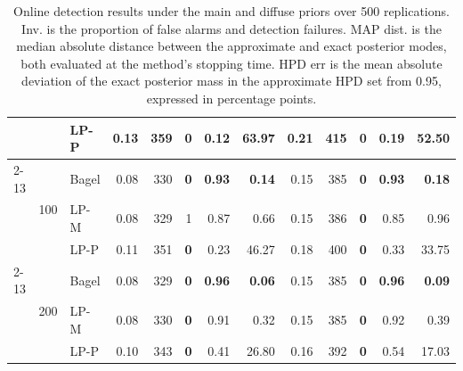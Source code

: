 \begin{table}[H]
{\begin{tabular}{l|r|l|r|r|r|r|r|r|r|r|r|r}
 &  & LP-P & 0.13 & 359 & \textbf{0} & 0.12 & 63.97 & 0.21 & 415 & \textbf{0} & 0.19 & 52.50 \\
\cline{2-13}
 & \multirow{3}{*}{100} & Bagel & 0.08 & 330 & \textbf{0} & \textbf{0.93} & \textbf{0.14} & 0.15 & 385 & \textbf{0} & \textbf{0.93} & \textbf{0.18} \\
 &  & LP-M & 0.08 & 329 & 1 & 0.87 & 0.66 & 0.15 & 386 & \textbf{0} & 0.85 & 0.96 \\
 &  & LP-P & 0.11 & 351 & \textbf{0} & 0.23 & 46.27 & 0.18 & 400 & \textbf{0} & 0.33 & 33.75 \\
\cline{2-13}
 & \multirow{3}{*}{200} & Bagel & 0.08 & 329 & \textbf{0} & \textbf{0.96} & \textbf{0.06} & 0.15 & 385 & \textbf{0} & \textbf{0.96} & \textbf{0.09} \\
 &  & LP-M & 0.08 & 330 & \textbf{0} & 0.91 & 0.32 & 0.15 & 385 & \textbf{0} & 0.92 & 0.39 \\
 &  & LP-P & 0.10 & 343 & \textbf{0} & 0.41 & 26.80 & 0.16 & 392 & \textbf{0} & 0.54 & 17.03 \\
\hline
\end{tabular}
}
\caption{Online detection results under the main and diffuse priors over 500 replications. Inv. is the proportion of false alarms and detection failures. MAP dist. is the median absolute distance between the approximate and exact posterior modes, both evaluated at the method's stopping time. HPD err is the mean absolute deviation of the exact posterior mass in the approximate HPD set from 0.95, expressed in percentage points.}
\label{tab:example2}
\end{table}
